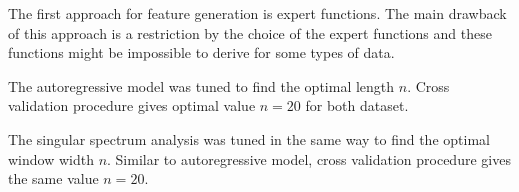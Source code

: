 The first approach for feature generation is expert functions. The main drawback of this approach is a restriction by the choice of the expert functions and these functions might be impossible to derive for some types of data.

The autoregressive model was tuned to find the optimal length $n$. Cross validation procedure gives optimal value $n=20$ for both dataset. 

The singular spectrum analysis was tuned in the same way to find the optimal window width $n$. Similar to autoregressive model, cross validation procedure gives the same value $n=20$.

\begin{figure}[!h]
	\centering
	\\
	\\

\end{figure}
